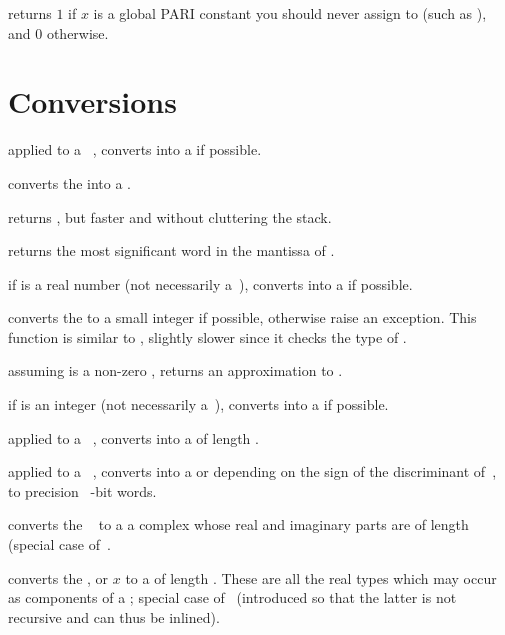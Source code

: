  returns $1$ if $x$ is a global PARI constant
you should never assign to (such as ), and $0$ otherwise.

\section{Conversions}


 applied to a ~, converts 
into a  if possible.

 converts the   into a
.

 returns , but
faster and without cluttering the stack.

 returns the most significant word
in the mantissa of .

 if  is a real number (not necessarily
a~), converts  into a  if possible.

 converts the   to a small
integer if possible, otherwise raise an exception. This function
is similar to , slightly slower since it checks the type of .

 assuming  is a non-zero ,
returns an approximation to .

 if  is an integer (not necessarily
a~), converts  into a  if possible.

 applied to a ~, converts
 into a  of length .

 applied to a ~, converts
 into a  or  depending on the sign of the
discriminant of~, to precision \hbox{ \B-bit} words.

 converts the ~ to a
a complex whose real and imaginary parts are  of length 
(special case of~.

 converts the
,  or  $x$ to a  of length .
These are all the real types which may occur as components of a
; special case of~ (introduced so that the latter is
not recursive and can thus be inlined).

